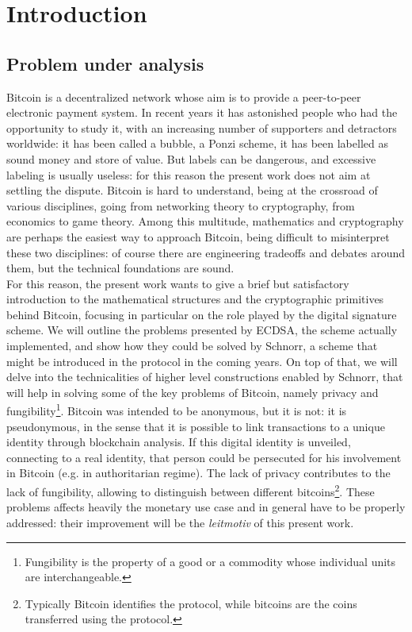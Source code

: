 \chapter{Introduction}
\label{chpr:intro}
\section{Problem under analysis}

Bitcoin \cite{BTC} is a decentralized network whose aim is to provide a peer-to-peer electronic payment system. In recent years it has astonished people who had the opportunity to study it, with an increasing number of supporters and detractors worldwide: it has been called a bubble, a Ponzi scheme, it has been labelled as sound money and store of value. But labels can be dangerous, and excessive labeling is usually useless: for this reason the present work does not aim at settling the dispute. Bitcoin is hard to understand, being at the crossroad of various disciplines, going from networking theory to cryptography, from economics to game theory. Among this multitude, mathematics and cryptography are perhaps the easiest way to approach Bitcoin, being difficult to misinterpret these two disciplines: of course there are engineering tradeoffs and debates around them, but the technical foundations are sound.
\\
For this reason, the present work wants to give a brief but satisfactory introduction to the mathematical structures and the cryptographic primitives behind Bitcoin, focusing in particular on the role played by the digital signature scheme. We will outline the problems presented by ECDSA, the scheme actually implemented, and show how they could be solved by Schnorr, a scheme that might be introduced in the protocol in the coming years. On top of that, we will delve into the technicalities of higher level constructions enabled by Schnorr, that will help in solving some of the key problems of Bitcoin, namely privacy and fungibility\footnote{Fungibility is the property of a good or a commodity whose individual units are interchangeable.}. Bitcoin was intended to be anonymous, but it is not: it is pseudonymous, in the sense that it is possible to link transactions to a unique identity through blockchain analysis. If this digital identity is unveiled, connecting to a real identity, that person could be persecuted for his involvement in Bitcoin (e.g. in authoritarian regime). The lack of privacy contributes to the lack of fungibility, allowing to distinguish between different bitcoins\footnote{Typically Bitcoin identifies the protocol, while bitcoins are the coins transferred using the protocol.}. These problems affects heavily the monetary use case and in general have to be properly addressed: their improvement will be the \textit{leitmotiv} of this present work.

